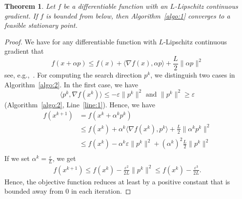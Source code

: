 \documentclass[letterpaper]{article} %
\newtheorem{theorem}{Theorem}
\newcommand{\setR}{\mathbb{R}}
\newcommand{\vareps}{\varepsilon}
\newcommand{\sprod}[2]{\langle{#1}, {#2}\rangle}
\begin{document}
\begin{theorem}\label{thm:1}
Let $f$ be a differentiable function with an $L$-Lipschitz continuous gradient. %
If $f$ is bounded from below, then Algorithm~\ref{algo:1} converges to a feasible stationary point. 
\end{theorem}

\begin{proof}
We have for any differentiable %
function with $L$-Lipschitz continuous gradient that
\[
  f(x+\alpha p) \leq f(x) + \sprod{\nabla f(x)}{\alpha p} + \frac{L}{2} \|\alpha p\|^2
\]
see, e.g.,~\cite{Nesterov04}. For computing the search direction $p^k$, we distinguish two cases in Algorithm~\ref{algo:2}. In the first case, we have 
\[
\sprod{p^k}{\nabla f(x^k)} \leq -\vareps \|p^k\|^2 \mbox{ and } \|p^k\|^2 \geq \vareps
\] (Algorithm~\ref{algo:2}, Line~\ref{line:1}). Hence, we have 
\[
\begin{split}
f(x^{k+1}) & = f(x^k+\alpha^kp^k) \\
& \leq f(x^k) + \alpha^k\sprod{\nabla f(x^k)}{p^k} + \frac{L}{2}\|\alpha^k p^k\|^2 \\
& \leq f(x^k) - \alpha^k \vareps\|p^k\|^2 + (\alpha^k)^2\frac{L}{2}\|p^k\|^2 \\
\end{split}
\]
If we set $\alpha^k = \frac{\vareps}{L}$, we get
\[
\begin{split}
f(x^{k+1}) \leq f(x^k) - \frac{\vareps^2}{2L}\|p^k\|^2 \leq f(x^k) - \frac{\varepsilon^3}{2L}.
\end{split}
\]
Hence, the objective function reduces at least by a positive constant that is bounded away from $0$ in each iteration.


\end{proof}
\end{document}
